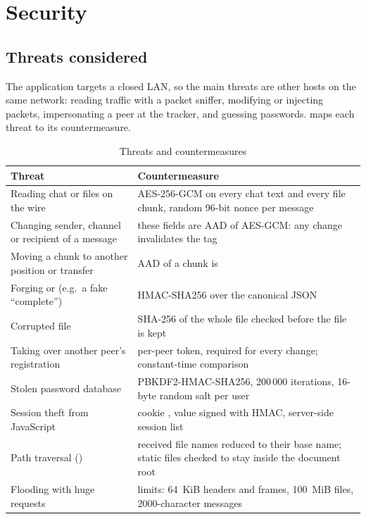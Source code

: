 \section{Security}\label{sec:security}

\subsection{Threats considered}
The application targets a closed LAN, so the main threats are other hosts on the same network:
reading traffic with a packet sniffer, modifying or injecting packets, impersonating a peer at the
tracker, and guessing passwords.  maps each threat to its countermeasure.

\begin{table}[H]\centering\footnotesize
\caption{Threats and countermeasures}\label{tab:threats}
\begin{tabularx}{\textwidth}{@{}>{\raggedright\arraybackslash}p{4.0cm} Y@{}}
\toprule
\textbf{Threat} & \textbf{Countermeasure} \\
\midrule
Reading chat or files on the wire & AES-256-GCM on every chat text and every file chunk, random 96-bit nonce per message \cite{nist80038d} \\
Changing sender, channel or recipient of a message & these fields are AAD of AES-GCM: any change invalidates the tag \\
Moving a chunk to another position or transfer & AAD of a chunk is  \\
Forging  or  (e.g.\ a fake ``complete'') & HMAC-SHA256 over the canonical JSON \cite{rfc2104} \\
Corrupted file & SHA-256 of the whole file checked before the file is kept \\
Taking over another peer's registration & per-peer token, required for every change; constant-time comparison \\
Stolen password database & PBKDF2-HMAC-SHA256, 200\,000 iterations, 16-byte random salt per user \cite{rfc8018} \\
Session theft from JavaScript & cookie , value signed with HMAC, server-side session list \\
Path traversal () & received file names reduced to their base name; static files checked to stay inside the document root \\
Flooding with huge requests & limits: \SI{64}{KiB} headers and frames, \SI{100}{MiB} files, 2000-character messages \\
\bottomrule
\end{tabularx}
\end{table}

